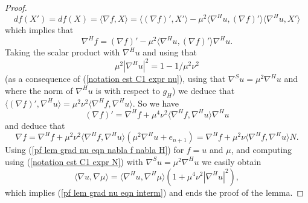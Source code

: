 \documentclass[10pt,a4paper]{amsart}
\begin{document}
\begin{proof}
$$df(X')=df(X)=\langle\nabla f,X\rangle=\langle (\nabla f)',X'\rangle-\mu^2\langle\nabla ^H u,(\nabla f)'\rangle\langle\nabla^Hu,X'\rangle$$
which implies that 
$$\nabla^Hf=(\nabla f)'-\mu^2\langle\nabla^Hu,(\nabla f)'\rangle\nabla^H u.$$ 
Taking the scalar product with $\nabla^Hu$ and using that 
\begin{equation}\label{est C1 expr gradH mu}
\mu^2|\nabla^Hu|^2=1-1/{\mu^2\nu^2}
\end{equation} 
(as a consequence of (\ref{notation est C1 expr nu}), using that $\nabla^Su=\mu^2\nabla^Hu$ and where the norm of $\nabla^Hu$ is with respect to $g_H$) we deduce that $\langle(\nabla f)',\nabla^Hu\rangle=\mu^2\nu^2\langle\nabla^Hf,\nabla^Hu\rangle.$ So we have
$$(\nabla f)'=\nabla^Hf+\mu^4\nu^2\langle\nabla^Hf,\nabla^Hu\rangle\nabla^Hu$$
and deduce that 
\begin{equation}\label{pf lem grad nu eqn nabla f nabla H}
\nabla f=\nabla^Hf+\mu^2\nu^2\langle\nabla^Hf,\nabla^Hu\rangle\left(\mu^2\nabla^Hu+e_{n+1}\right)=\nabla^Hf+\mu^2\nu\langle\nabla^Hf,\nabla^Hu\rangle N.
\end{equation}
Using (\ref{pf lem grad nu eqn nabla f nabla H}) for $f=u$ and $\mu$, and computing using (\ref{notation est C1 expr N}) with $\nabla^Su=\mu^2\nabla^Hu$ we easily obtain
$$\langle\nabla u,\nabla\mu\rangle=\langle\nabla^H u,\nabla^H\mu\rangle\left(1+\mu^4\nu^2|\nabla^Hu|^2\right),$$
which implies (\ref{pf lem grad nu eqn interm}) and ends the proof of the lemma.
\end{proof}
\end{document}
